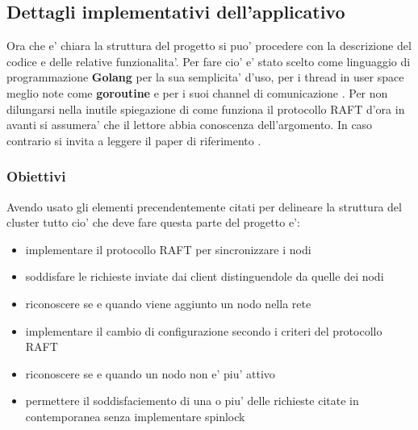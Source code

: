\subsection{Dettagli implementativi dell'applicativo}

Ora che e' chiara la struttura del progetto si puo' procedere con la descrizione del
codice e delle relative funzionalita'. Per fare cio' e' stato scelto come linguaggio
di programmazione \textbf{Golang} per la sua semplicita' d'uso, per i thread in user space
meglio note come \textbf{goroutine} e per i suoi channel di comunicazione \cite{4}.
Per non dilungarsi nella inutile spiegazione di come funziona il protocollo RAFT d'ora in avanti
si assumera' che il lettore abbia conoscenza dell'argomento. In caso contrario si invita
a leggere il paper di riferimento \cite{1}.
\subsubsection{Obiettivi}
Avendo usato gli elementi precendentemente citati per delineare la struttura del cluster tutto
cio' che deve fare questa parte del progetto e':
\begin{itemize}
    \item implementare il protocollo RAFT per sincronizzare i nodi
    \item soddisfare le richieste inviate dai client distinguendole da quelle dei nodi
    \item riconoscere se e quando viene aggiunto un nodo nella rete
    \item implementare il cambio di configurazione secondo i criteri del protocollo RAFT
    \item riconoscere se e quando un nodo non e' piu' attivo
    \item permettere il soddisfaciemento di una o piu' delle richieste citate in contemporanea 
        senza implementare spinlock
\end{itemize}

